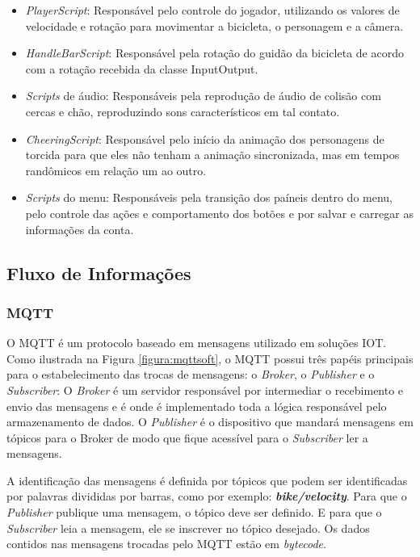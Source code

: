 \begin{itemize}
\item \textit{PlayerScript}: Responsável pelo controle do jogador, utilizando os valores de velocidade e rotação para movimentar a bicicleta, o personagem e a câmera.
\item \textit{HandleBarScript}: Responsável pela rotação do guidão da bicicleta de acordo com a rotação recebida da classe InputOutput.
\item \textit{Scripts} de áudio: Responsáveis pela reprodução de áudio de colisão com cercas e chão, reproduzindo sons característicos em tal contato.
\item \textit{CheeringScript}: Responsável pelo início da animação dos personagens de torcida para que eles não tenham a animação sincronizada, mas em tempos randômicos em relação um ao outro.
\item \textit{Scripts} do menu: Responsáveis pela transição dos paíneis dentro do menu, pelo controle das ações e comportamento dos botões e por salvar e carregar as informações da conta.
\end{itemize}

\subsection{Fluxo de Informa\c{c}ões}
\subsubsection{MQTT}

O MQTT é um protocolo baseado em mensagens utilizado em soluções IOT. Como ilustrada na Figura \ref{figura:mqttsoft}, o MQTT possui três papéis principais para o estabelecimento das trocas de mensagens: o \textit{Broker}, o \textit{Publisher} e o \textit{Subscriber}: O \textit{Broker} é um servidor responsável por intermediar o recebimento e envio das mensagens e é onde é implementado toda a lógica responsável pelo armazenamento de dados. O \textit{Publisher} é o dispositivo que mandará mensagens em tópicos para o Broker de modo que fique acessível para o \textit{Subscriber} ler a mensagens.

A identificação das mensagens é definida por tópicos que podem ser identificadas por palavras divididas por barras, como por exemplo: \textit{\textbf{bike/velocity}}. Para que o \textit{Publisher} publique uma mensagem, o tópico deve ser definido. E para que o \textit{Subscriber} leia a mensagem, ele se inscrever no tópico desejado. Os dados contidos nas mensagens trocadas pelo MQTT estão em \textit{bytecode}.

